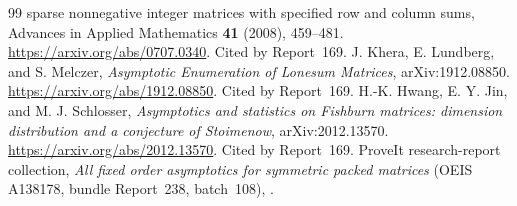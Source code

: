 \documentclass[11pt]{article}
\numberwithin{equation}{section}
\theoremstyle{definition}
\theoremstyle{remark}
\begin{document}
\begin{thebibliography}{99}
{sparse nonnegative integer matrices with specified row and column sums},
Advances in Applied Mathematics \textbf{41} (2008), 459--481.
\url{https://arxiv.org/abs/0707.0340}. Cited by Report~169.
 J. Khera, E. Lundberg, and S. Melczer, \emph{Asymptotic
Enumeration of Lonesum Matrices}, arXiv:1912.08850.
\url{https://arxiv.org/abs/1912.08850}. Cited by Report~169.
 H.-K. Hwang, E. Y. Jin, and M. J. Schlosser,
\emph{Asymptotics and statistics on Fishburn matrices: dimension
distribution and a conjecture of Stoimenow}, arXiv:2012.13570.
\url{https://arxiv.org/abs/2012.13570}. Cited by Report~169.
 ProveIt research-report collection, \emph{All fixed order
asymptotics for symmetric packed matrices} (OEIS A138178, bundle Report~238,
batch~108),
.
\end{thebibliography}
\end{document}
